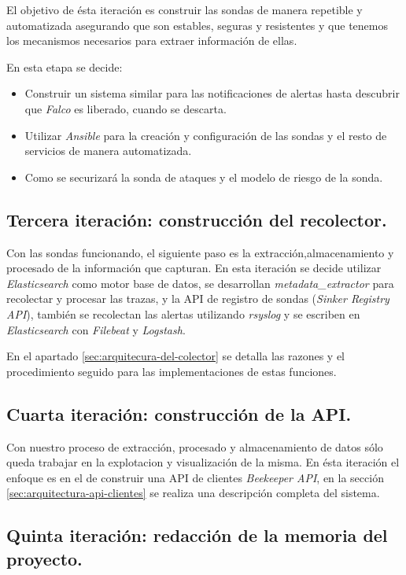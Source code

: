 El objetivo de ésta iteración es construir las sondas de manera repetible y automatizada asegurando que son estables,
seguras y resistentes y que tenemos los mecanismos necesarios para extraer información de ellas.

En esta etapa se decide:

\begin{itemize}
    \item Construir un sistema similar para las notificaciones de alertas hasta descubrir que \emph{Falco} es liberado, cuando se descarta.
    \item Utilizar \emph{Ansible} para la creación y configuración de las sondas y el resto de servicios de manera automatizada.
    \item Como se securizará la sonda de ataques y el modelo de riesgo de la sonda.
\end{itemize}

\subsection{Tercera iteración: construcción del recolector.}

Con las sondas funcionando, el siguiente paso es la extracción,almacenamiento y procesado de la información que capturan. En esta iteración
se decide utilizar \emph{Elasticsearch} como motor base de datos, se desarrollan \emph{metadata\_extractor} para recolectar y procesar las trazas, y 
la API de registro de sondas (\emph{Sinker Registry API}), también se recolectan las alertas utilizando \emph{rsyslog} y se escriben en \emph{Elasticsearch}
con \emph{Filebeat} y \emph{Logstash}.

En el apartado \ref{sec:arquitecura-del-colector} se detalla las razones y el procedimiento seguido para las implementaciones de estas funciones.

\subsection{Cuarta iteración: construcción de la API.}

Con nuestro proceso de extracción, procesado y almacenamiento de datos sólo queda trabajar en la explotacion y visualización de la misma. En ésta iteración
el enfoque es en el de construir una API de clientes \emph{Beekeeper API}, en la sección \ref{sec:arquitectura-api-clientes} se realiza
una descripción completa del sistema.

\subsection{Quinta iteración: redacción de la memoria del proyecto.}

